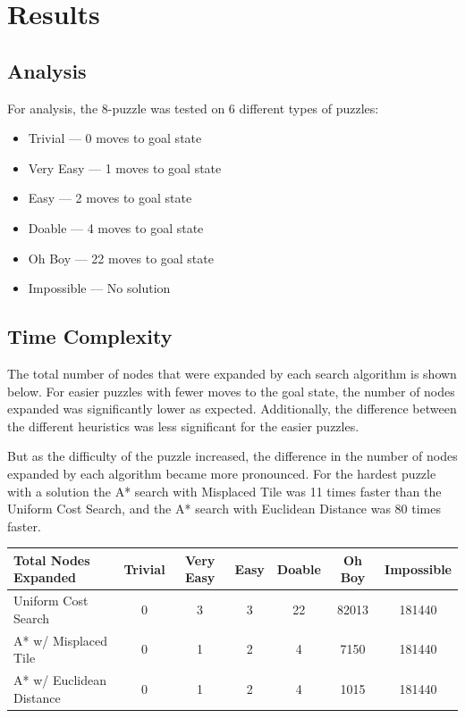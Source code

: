 \documentclass[12pt, english]{article}
\begin{document}
    \section{Results}

    \subsection{Analysis}

    For analysis, the 8-puzzle was tested on 6 different types of puzzles:
    \begin{itemize}
        \item Trivial --- 0 moves to goal state
        \item Very Easy --- 1 moves to goal state
        \item Easy --- 2 moves to goal state
        \item Doable --- 4 moves to goal state
        \item Oh Boy --- 22 moves to goal state
        \item Impossible --- No solution
    \end{itemize}

    \subsection{Time Complexity}

    The total number of nodes that were expanded by each search algorithm is shown below.
    For easier puzzles with fewer moves to the goal state, the number of nodes expanded
    was significantly lower as expected. Additionally, the difference between the different
    heuristics was less significant for the easier puzzles. 
    
    But as the difficulty of the puzzle increased, the difference in the number of nodes 
    expanded by each algorithm became more pronounced. For the hardest puzzle with a 
    solution the A* search with Misplaced Tile was 11 times faster than the Uniform Cost
    Search, and the A* search with Euclidean Distance was 80 times faster.

    \begin{center}
        \begin{tabular}{|l|c|c|c|c|c|c|}
            \hline
            Total Nodes Expanded & Trivial & Very Easy & Easy & Doable & Oh Boy & Impossible \\
            \hline
            Uniform Cost Search & 0 & 3 & 3 & 22 & 82013 & 181440 \\
            A* w/ Misplaced Tile & 0 & 1 & 2 & 4 & 7150 & 181440 \\
            A* w/ Euclidean Distance & 0 & 1 & 2 & 4 & 1015 & 181440 \\
            \hline
        \end{tabular}
    \end{center}
\end{document}

